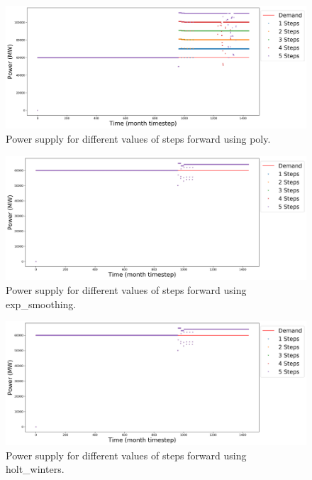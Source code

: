 \documentclass[11pt]{article}
\begin{document}
\begin{figure}[H]
	\centering
	\includegraphics[width=\textwidth]{29-figures/29-power-buffer0-poly-steps.png} 
	\hfill
	\caption{Power supply for different values of steps forward using poly.}
	\label{fig:29-ste-poly}
\end{figure}

\begin{figure}[H]
	\centering
	\includegraphics[width=\textwidth]{29-figures/29-power-buffer0-exp_smoothing-steps.png} 
	\hfill
	\caption{Power supply for different values of steps forward using exp\_smoothing.}
	\label{fig:29-ste-exp_smoothing}
\end{figure}

\begin{figure}[H]
	\centering
	\includegraphics[width=\textwidth]{29-figures/29-power-buffer0-holt_winters-steps.png} 
	\hfill
	\caption{Power supply for different values of steps forward using holt\_winters.}
	\label{fig:29-ste-hots_winters}
\end{figure}
\end{document}

